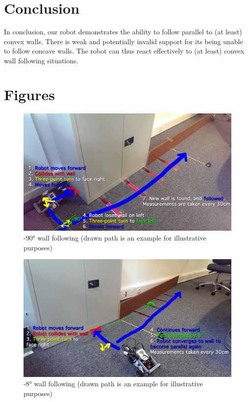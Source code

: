 \documentclass[a4paper,12pt]{article}
\begin{document}
\section{Conclusion}

In conclusion, our robot demonstrates the ability to follow parallel to (at least) convex walls. There is weak and potentially invalid support for its being unable to follow concave walls. The robot can thus react effectively to (at least) convex wall following situations.

\section{Figures}

\begin{figure}[ht]
\centerline{\includegraphics[width=8in]{CourseM90_Edit.jpg}}
\caption{\ang{-90} wall following (drawn path is an example for illustrative purposes)}
\label{fig:coursem90}
\end{figure}

\begin{figure}[ht]
\centerline{\includegraphics[width=8in]{CourseM8_Edit.jpg}}
\caption{\ang{-8} wall following (drawn path is an example for illustrative purposes)}
\label{fig:coursem8}
\end{figure}
\end{document}
